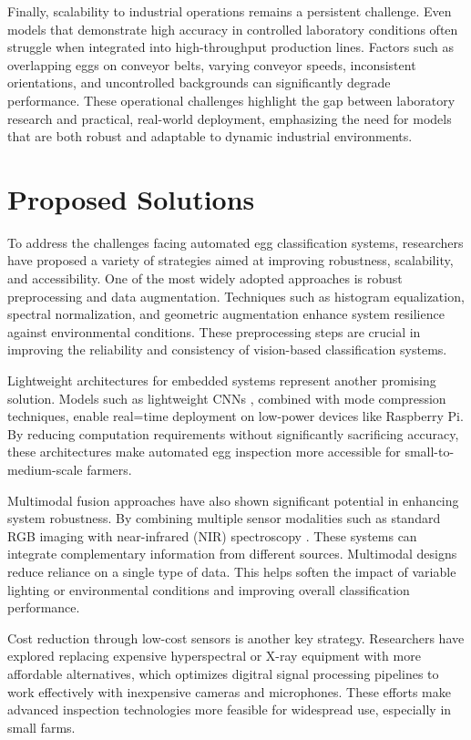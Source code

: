 \documentclass[conference]{IEEEtran}
\begin{document}
	Finally, scalability to industrial operations remains a persistent challenge. Even models that demonstrate high accuracy in controlled laboratory conditions often struggle when integrated into high-throughput production lines. Factors such as overlapping eggs on conveyor belts, varying conveyor speeds, inconsistent orientations, and uncontrolled backgrounds can significantly degrade performance. These operational challenges highlight the gap between laboratory research and practical, real-world deployment, emphasizing the need for models that are both robust and adaptable to dynamic industrial environments.

	\section{Proposed Solutions}
	
	To address the challenges facing automated egg classification systems, researchers have proposed a variety of strategies aimed at improving robustness, scalability, and accessibility. One of the most widely adopted approaches is robust preprocessing and data augmentation. Techniques such as histogram equalization, spectral normalization, and geometric augmentation enhance system resilience against environmental conditions. These preprocessing steps are crucial in improving the reliability and consistency of vision-based classification systems.
	
	Lightweight architectures for embedded systems represent another promising solution. Models such as lightweight CNNs \cite{chen2022lightweight}, combined with mode compression techniques, enable real=time deployment on low-power devices like Raspberry Pi. By reducing computation requirements without significantly sacrificing accuracy, these architectures make automated egg inspection more accessible for small-to-medium-scale farmers.
	
	Multimodal fusion approaches have also shown significant potential in enhancing system robustness. By combining multiple sensor modalities such as standard RGB imaging with near-infrared (NIR) spectroscopy \cite{garcia2024fusion}. These systems can integrate complementary information from different sources. Multimodal designs reduce reliance on a single type of data. This helps soften the impact of variable lighting or environmental conditions and improving overall classification performance.
	
	Cost reduction through low-cost sensors is another key strategy. Researchers have explored replacing expensive hyperspectral or X-ray equipment with more affordable alternatives, which optimizes digitral signal processing pipelines to work effectively with inexpensive cameras and microphones. These efforts make advanced inspection technologies more feasible for widespread use, especially in small farms.
\end{document}
